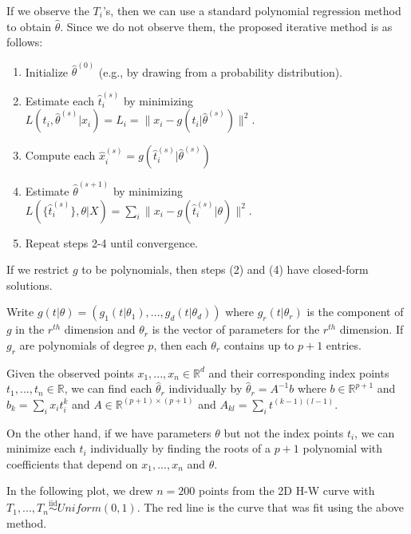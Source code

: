\documentclass[
  11pt,
]{article}
\providecommand{\tightlist}{%
  \setlength{\itemsep}{0pt}\setlength{\parskip}{0pt}}
\begin{document}
If we observe the \(T_i\)'s, then we can use a standard polynomial
regression method to obtain \(\hat{\theta}\). Since we do not observe
them, the proposed iterative method is as follows:

\begin{enumerate}
\def\labelenumi{\arabic{enumi}.}
\tightlist
\item
  Initialize \(\hat{\theta}^{(0)}\) (e.g., by drawing from a probability
  distribution).
\item
  Estimate each \(\hat{t}_i^{(s)}\) by minimizing
  \(L(t_i, \hat{\theta}^{(s)} | x_i) = L_i = \|x_i - g(t_i | \hat{\theta}^{(s)})\|^2\).
\item
  Compute each
  \(\hat{x}_i^{(s)} = g(\hat{t}_i^{(s)} | \hat{\theta}^{(s)})\)
\item
  Estimate \(\hat{\theta}^{(s+1)}\) by minimizing
  \(L(\{\hat{t}_i^{(s)}\}, \theta | X) = \sum_i \|x_i - g(\hat{t}_i^{(s)} | \theta)\|^2\).
\item
  Repeat steps 2-4 until convergence.
\end{enumerate}

If we restrict \(g\) to be polynomials, then steps (2) and (4) have
closed-form solutions.

\begin{example}

Write $g(t | \theta) = (g_1(t | \theta_1), ..., g_d(t | \theta_d))$ where $g_r(t | \theta_r)$ is the component of $g$ in the $r^{th}$ dimension and $\theta_r$ is the vector of parameters for the $r^{th}$ dimension. If $g_r$ are polynomials of degree $p$, then each $\theta_r$ contains up to $p + 1$ entries. 

Given the observed points $x_1, ..., x_n \in \mathbb{R}^d$ and their corresponding index points $t_1, ..., t_n \in \mathbb{R}$, we can find each $\hat{\theta}_r$ individually by $\hat{\theta}_r = A^{-1} b$ where $b \in \mathbb{R}^{p+1}$ and $b_k = \sum_i x_i t_i^k$ and $A \in \mathbb{R}^{(p+1) \times (p+1)}$ and $A_{kl} = \sum_i t^{(k-1) (l-1)}$.

On the other hand, if we have parameters $\theta$ but not the index points $t_i$, we can minimize each $t_i$ individually by finding the roots of a $p+1$ polynomial with coefficients that depend on $x_1, ..., x_n$ and $\theta$. 

In the following plot, we drew $n = 200$ points from the 2D H-W curve with $T_1, ..., T_n \stackrel{\mathrm{iid}}{\sim}Uniform(0, 1)$. 
The red line is the curve that was fit using the above method. 

\end{example}
\end{document}

